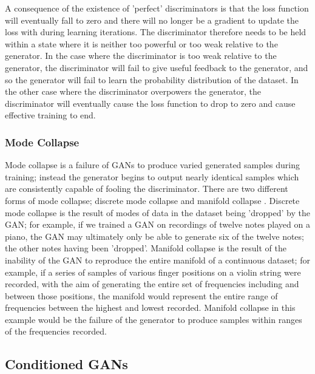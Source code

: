 \documentclass[a4paper, titlepage]{article}
\begin{document}
A consequence of the existence of 'perfect' discriminators is that the loss function will eventually fall to zero and there will no longer be a gradient to update the loss with during learning iterations.
The discriminator therefore needs to be held within a state where it is neither too powerful or too weak relative to the generator.
\newline
\newline
In the case where the discriminator is too weak relative to the generator, the discriminator will fail to give useful feedback to the generator, and so the generator will fail to learn the probability distribution of the dataset.
In the other case where the discriminator overpowers the generator, the discriminator will eventually cause the loss function to drop to zero and cause effective training to end.

\subsubsection{Mode Collapse}

Mode collapse is a failure of \ac{GAN}s to produce varied generated samples during training; instead the generator begins to output nearly identical samples which are consistently capable of fooling the discriminator.
There are two different forms of mode collapse; discrete mode collapse and manifold collapse \citep{DBLP:journals/corr/MetzPPS16}.
\newline
\newline
Discrete mode collapse is the result of modes of data in the dataset being 'dropped' by the \ac{GAN}; for example, if we trained a \ac{GAN} on recordings of twelve notes played on a piano, the \ac{GAN} may ultimately only be able to generate six of the twelve notes; the other notes having been 'dropped'.
\newline
\newline
Manifold collapse is the result of the inability of the \ac{GAN} to reproduce the entire manifold of a continuous dataset; for example, if a series of samples of various finger positions on a violin string were recorded, with the aim of generating the entire set of frequencies including and between those positions, the manifold would represent the entire range of frequencies between the highest and lowest recorded.
Manifold collapse in this example would be the failure of the generator to produce samples within ranges of the frequencies recorded.

\subsection{Conditioned GANs}
\end{document}
